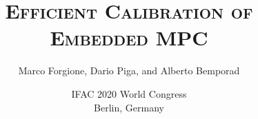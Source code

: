 \usepackage[english]{babel}
\usepackage{amsmath}
\usepackage[latin1]{inputenc}
\usepackage{units}
\usepackage{colortbl}
\usepackage{multimedia}
\usepackage{bm}

{
}
	

\title[Efficient Calibration of Embedded MPC]{\textsc{Efficient Calibration of Embedded MPC}}


\author[]{Marco Forgione, Dario Piga, 
and Alberto Bemporad }



\date[IFAC 2020]{IFAC 2020 World Congress\\ Berlin, Germany}


\subject{Performance-oriented MPC tuning}


\newcommand{\norm}[1]{\left \lVert #1 \right \rVert}
\DeclareMathOperator*\argmin{arg \, min}
\DeclareMathOperator*\cov{cov}


\newcommand{\K}{K}
\newcommand{\M}{M}
\newcommand{\Mo}{M_o}
\newcommand{\So}{S_o}
\newcommand{\Smod}{S}
\newcommand{\parcolor}[1]{{\color{orange}#1}}
\newcommand{\Ts}{T_s^{\rm MPC}}
\newcommand{\cites}[1]{\begin{small}(#1)\end{small}}

